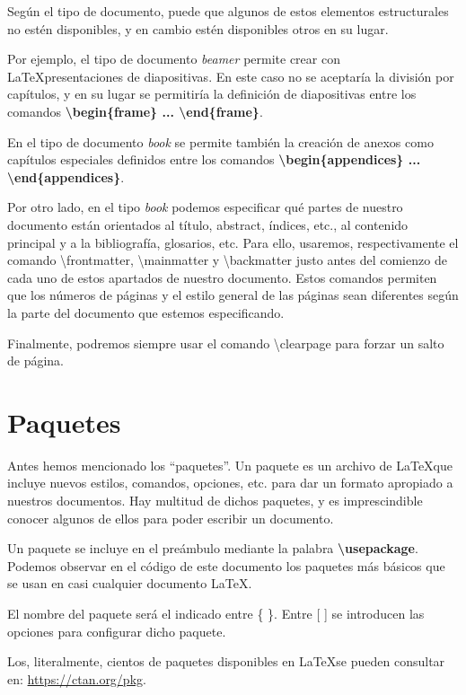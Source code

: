 \documentclass[12pt]{book} %
\begin{document}
Según el tipo de documento, puede que algunos de estos elementos estructurales no estén disponibles, y en cambio estén disponibles otros en su lugar.

Por ejemplo, el tipo de documento \emph{beamer} permite crear con \LaTeX presentaciones de diapositivas. En este caso no se aceptaría la división por capítulos, y en su lugar se permitiría la definición de diapositivas entre los comandos \textbf{\textbackslash begin\{frame\} ... \textbackslash end\{frame\}}.

En el tipo de documento \emph{book} se permite también la creación de anexos como capítulos especiales definidos entre los comandos \textbf{\textbackslash begin\{appendices\} ... \textbackslash end\{appendices\}}.

Por otro lado, en el tipo \emph{book} podemos especificar qué partes de nuestro documento están orientados al título, abstract, índices, etc., al contenido principal y a la bibliografía, glosarios, etc. Para ello, usaremos, respectivamente el comando \textbackslash frontmatter, \textbackslash mainmatter y \textbackslash backmatter justo antes del comienzo de cada uno de estos apartados de nuestro documento. Estos comandos permiten que los números de páginas y el estilo general de las páginas sean diferentes según la parte del documento que estemos especificando.

Finalmente, podremos siempre usar el comando \textbackslash clearpage para forzar un salto de página.

\section{Paquetes}

Antes hemos mencionado los ``paquetes''. Un paquete es un archivo de \LaTeX que incluye nuevos estilos, comandos, opciones, etc. para dar un formato apropiado a nuestros documentos. Hay multitud de dichos paquetes, y es imprescindible conocer algunos de ellos para poder escribir un documento.

Un paquete se incluye en el preámbulo mediante la palabra \textbf{\textbackslash usepackage}. Podemos observar en el código de este documento los paquetes más básicos que se usan en casi cualquier documento \LaTeX. 

El nombre del paquete será el indicado entre \{ \}.  Entre [ ] se introducen las opciones para configurar dicho paquete.

Los, literalmente, cientos de paquetes disponibles en \LaTeX se pueden consultar en: \url{https://ctan.org/pkg}.
\end{document}
